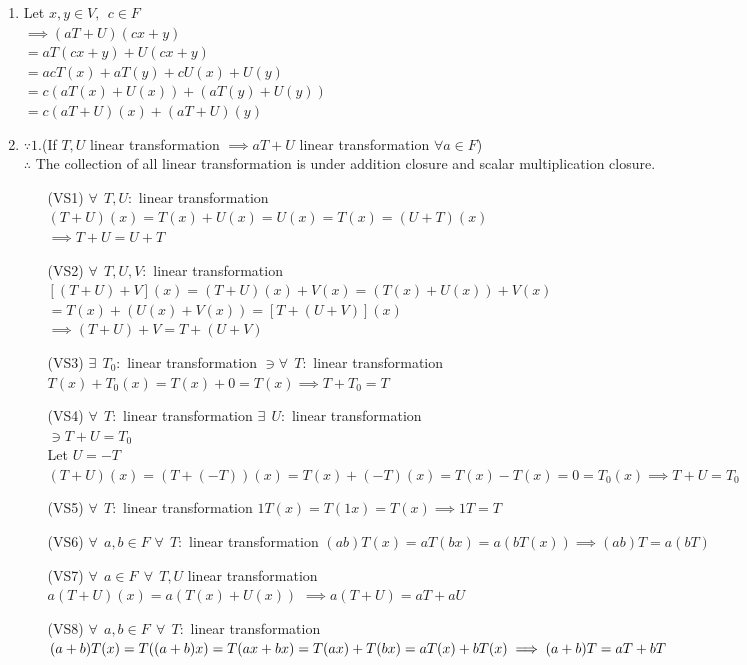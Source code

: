 \begin{enumerate}
	\item Let $x, y \in V , \ \ c \in F$ \\
	$\implies (aT+U)(cx+y)$ \\
	$=aT(cx+y)+U(cx+y)$ \\ 
	$=acT(x)+aT(y)+cU(x)+U(y)$\\
	$=c(aT(x)+U(x))+(aT(y)+U(y))$\\
	$=c(aT+U)(x)+(aT+U)(y)$\\
	\item $\because 1.$(If $T,U$ linear transformation $\implies aT+U$ linear transformation $\forall a \in F$) \\
	$\therefore$ The collection of all linear transformation is under addition closure and scalar multiplication closure. \\
\newpage

\begin{enumerate}
	\item[(VS1)] $\forall \ \ T,U:$ linear transformation \\$(T+U)(x) = T(x) + U(x) = U(x) = T(x) = (U+T)(x)$ \\
	$\implies T+U = U+T$\\
	\item[(VS2)] $\forall \ \ T,U,V:$ linear transformation \\
	$[(T+U)+V](x)=(T+U)(x)+V(x)=(T(x)+U(x))+V(x)$\\
	$=T(x)+(U(x)+V(x))=[T+(U+V)](x)$\\
	$\implies (T+U)+V = T+(U+V)$
	\item[(VS3)] $\exists \ \ T_0:$ linear transformation $\ni \forall \ \ T:$ linear transformation \\
	$T(x) + T_0(x) = T(x) + 0 = T(x) \implies T+T_0=T$
	\item[(VS4)] $\forall \ \ T:$ linear transformation $\exists \ \ U:$ linear transformation \\$\ni T+U = T_0$\\
	Let $U=-T$ \\
	$(T+U)(x)=(T+(-T))(x)=T(x)+(-T)(x)=T(x)-T(x)=0=T_0(x) \implies T+U=T_0$
	\item[(VS5)] $\forall \ \ T:$ linear transformation $1T(x)=T(1x)=T(x)\implies 1T=T$
	\item[(VS6)] $\forall \ \ a, b \in F $ $\forall \ \ T:$ linear transformation $(ab)T(x)=aT(bx)=a(bT(x)) \implies (ab)T=a(bT)$
	\item[(VS7)]$\forall \ \ a \in F \ \ \forall \ \ T,U$ linear transformation \\ $a(T+U)(x)=a(T(x)+U(x))$ 
	$\implies a(T+U)=aT+aU$
	\item[(VS8)]$\forall \ \ a, b \in F \ \ \forall \ \ T:$ linear transformation \\
	$(a+b)T(x) = T((a+b)x) \\ = T(ax+bx)=T(ax)+T(bx)\\=aT(x)+bT(x) \implies (a+b)T=aT+bT$
\end{enumerate}


\end{enumerate}
